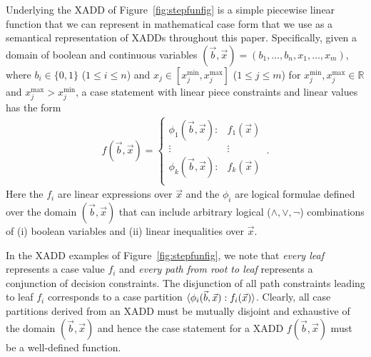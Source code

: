 
Underlying the XADD of Figure~\ref{fig:stepfunfig} is a simple
piecewise linear function that we can represent in mathematical case
form that we use as a semantical representation of XADDs throughout
this paper.  Specifically, given a domain of boolean and continuous
variables $(\vec{b},\vec{x}) = ( b_1,\ldots,b_n,x_{1},\ldots,x_m )$,
where $b_i \in \{ 0,1 \}$ ($1 \leq i \leq n$) and $x_j \in
[x_j^{\min},x_j^{\max}]$ ($1 \leq j \leq m$) for
$x_j^{\min},x_j^{\max} \in \mathbb{R}$ and $x_j^{\max} > x_j^{\min}$, a case
statement with linear piece constraints and linear values has the form
{\footnotesize 
\begin{align}
f(\vec{b},\vec{x}) = 
\begin{cases}
  \phi_1(\vec{b},\vec{x}): & f_1(\vec{x}) \\ 
 \vdots&\vdots\\ 
  \phi_k(\vec{b},\vec{x}): & f_k(\vec{x}) \\ 
\end{cases} \, . \label{eq:case}
\end{align}
} 
Here the $f_i$ are linear expressions over $\vec{x}$ and the $\phi_i$
are logical formulae defined over the domain $(\vec{b},\vec{x})$ that
can include arbitrary logical ($\land,\lor,\neg$) combinations of (i)
boolean variables and (ii) linear inequalities over $\vec{x}$.

In the XADD examples of Figure~\ref{fig:stepfunfig}, we note that 
\emph{every leaf} represents a case value $f_i$ and 
\emph{every path from root to leaf} represents a conjunction
of decision constraints.  The disjunction of all path constraints
leading to leaf $f_i$ corresponds to a case partition
$\langle \phi_i(\vec{b},\vec{x}) : f_i(\vec{x}) \rangle$.  Clearly, all case
partitions derived from an XADD must be mutually disjoint and
exhaustive of the domain $(\vec{b},\vec{x})$ and hence the 
case statement for a XADD $f(\vec{b},\vec{x})$ must be a well-defined
function.

